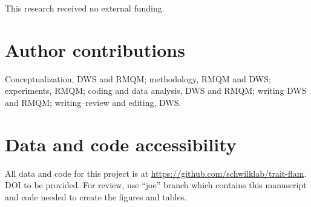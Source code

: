 \documentclass[letterpaper,12pt]{article}
\begin{document}
This research received no external funding.

\section*{Author contributions}

Conceptualization, DWS and RMQM; methodology, RMQM and DWS; experiments, RMQM;
coding and data analysis, DWS and RMQM; writing DWS and RMQM; writing--review
and editing, DWS.

\section*{Data and code accessibility}
All data and code for this project is at
\url{https://github.com/schwilklab/trait-flam}. DOI to be provided. For review,
use ``joe'' branch which contains this manuscript and code needed to create the
figures and tables.

\newpage




\end{document}
